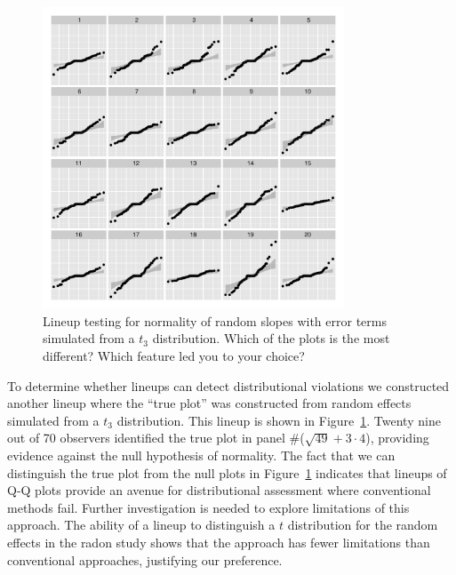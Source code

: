 \documentclass[12pt]{article} %
\begin{document}
\begin{figure}
	\centering
	\includegraphics[width=0.8\textwidth]{radontranef-19.pdf}
	\caption{\label{fig:qqlineup-t} Lineup  testing for normality of random slopes with error terms simulated from a $t_3$ distribution. Which of the plots is the most different? Which feature led you to your choice?}
\end{figure}


To determine whether lineups can detect distributional violations we constructed another lineup where the ``true plot'' was constructed from random effects simulated from a $t_3$ distribution. This lineup is shown in Figure~\ref{fig:qqlineup-t}. Twenty nine out of 70 observers identified the true plot in panel \#($\sqrt{49} + 3\cdot4$), providing evidence against the null hypothesis of normality.  
 The fact that we can distinguish the true plot from the null plots in Figure~\ref{fig:qqlineup-t} indicates that lineups of Q-Q plots provide an avenue for distributional assessment where conventional methods fail. Further investigation is needed to explore limitations of this approach. %
 The ability of a lineup to distinguish a $t$ distribution for the random effects in the radon study shows that the approach has fewer limitations than conventional approaches, justifying our preference.
\end{document}
